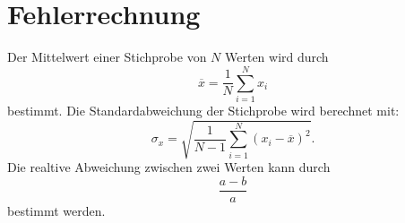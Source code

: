 \section{Fehlerrechnung}

Der Mittelwert einer Stichprobe von $N$ Werten wird durch
\begin{equation*}
    \overline{x} = \frac{1}{N} \sum_{i=1}^N x_i
    \label{eqn:mittelwert}
\end{equation*}
bestimmt.
\newline
Die Standardabweichung der Stichprobe wird berechnet mit:
\begin{equation*}
    \sigma_x = \sqrt{\frac{1}{N-1} \sum_{i=1}^N (x_i - \overline{x})^2}.
    \label{eqn:standard}
\end{equation*}
\newline
Die realtive Abweichung zwischen zwei Werten kann durch
\begin{equation*}
    \frac{a-b}{a}
\end{equation*}
bestimmt werden.